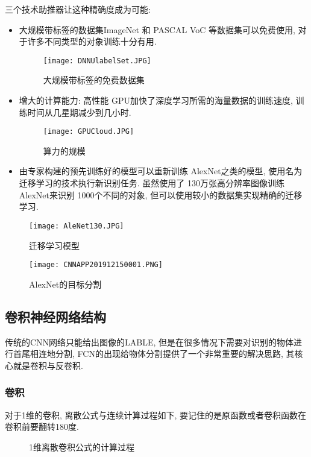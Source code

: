 三个技术助推器让这种精确度成为可能:
\begin{itemize}
\item 大规模带标签的数据集ImageNet 和 PASCAL VoC 等数据集可以免费使用, 对于许多不同类型的对象训练十分有用.
\begin{figure}[H]
    \centering
    \texttt{[image: DNNUlabelSet.JPG]}
    \caption{大规模带标签的免费数据集}
    \label{DNNUlabelSet201912250001}
    \vspace{-0.4cm}
\end{figure}
\item 增大的计算能力: 高性能 GPU加快了深度学习所需的海量数据的训练速度, 训练时间从几星期减少到几小时.
\begin{figure}[H]
    \centering
    \texttt{[image: GPUCloud.JPG]}
    \caption{算力的规模}
    \label{GPUCloud201912250002}
\end{figure}
\item 由专家构建的预先训练好的模型可以重新训练 AlexNet之类的模型, 使用名为迁移学习的技术执行新识别任务.
虽然使用了 130万张高分辨率图像训练 AlexNet来识别 1000个不同的对象, 但可以使用较小的数据集实现精确的迁移学习.
\end{itemize}
\begin{figure}[H]
    \centering
    \texttt{[image: AleNet130.JPG]}
    \caption{迁移学习模型}
    \label{AleNet130201912250003}
\end{figure}
\begin{figure}[H]
    \centering
    \texttt{[image: CNNAPP201912150001.PNG]}
    \caption{ AlexNet的目标分割}
    \label{CNNAPP201912150001}
\end{figure}
\subsection{卷积神经网络结构}
传统的CNN网络只能给出图像的LABLE, 但是在很多情况下需要对识别的物体进行首尾相连地分割, FCN的出现给物体分割提供了一个非常重要的解决思路, 其核心就是卷积与反卷积.
\subsubsection{卷积}
对于1维的卷积, 离散公式与连续计算过程如下, 要记住的是原函数或者卷积函数在卷积前要翻转180度.
\begin{figure}[H]
\centering
{}
\caption{1维离散卷积公式的计算过程}
\label{ConvolutionOP0203}
\end{figure}


